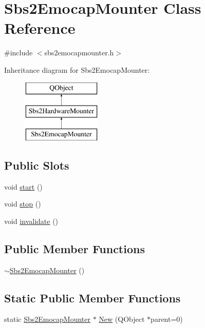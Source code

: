 \hypertarget{classSbs2EmocapMounter}{\section{Sbs2\-Emocap\-Mounter Class Reference}
\label{classSbs2EmocapMounter}
}


{\ttfamily \#include $<$sbs2emocapmounter.\-h$>$}

Inheritance diagram for Sbs2\-Emocap\-Mounter\-:\begin{figure}[H]
\begin{center}
\leavevmode
\includegraphics[height=3.000000cm]{classSbs2EmocapMounter}
\end{center}
\end{figure}
\subsection*{Public Slots}
\begin{DoxyCompactItemize}
\item 
void \hyperlink{classSbs2EmocapMounter_a25805c484788e484bdac53a806c822eb}{start} ()
\item 
void \hyperlink{classSbs2EmocapMounter_a6ad15728a9361481d85480a9ec7fa8dd}{stop} ()
\item 
void \hyperlink{classSbs2EmocapMounter_a77a3a401dfa47baf5f7d0e70095c7072}{invalidate} ()
\end{DoxyCompactItemize}
\subsection*{Public Member Functions}
\begin{DoxyCompactItemize}
\item 
\hyperlink{classSbs2EmocapMounter_a1df4f11a64da9aa21ba890c8991b4912}{$\sim$\-Sbs2\-Emocap\-Mounter} ()
\end{DoxyCompactItemize}
\subsection*{Static Public Member Functions}
\begin{DoxyCompactItemize}
\item 
static \hyperlink{classSbs2EmocapMounter}{Sbs2\-Emocap\-Mounter} $\ast$ \hyperlink{classSbs2EmocapMounter_a356acdbf5ccaab6ff730b29c4e25a260}{New} (Q\-Object $\ast$parent=0)
\end{DoxyCompactItemize}
